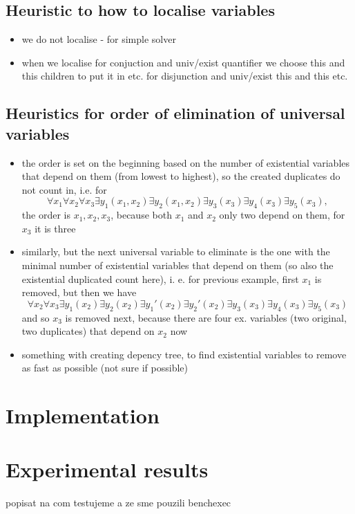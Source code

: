 \documentclass[
  digital, %
  twoside, %
  table,   %
  nolof,     %
  nolot,     %
]{fithesis3}
\theoremstyle{definition}
\theoremstyle{remark}
\begin{document}
\section{Heuristic to how to localise variables}
\begin{itemize}
    \item we do not localise - for simple solver
    \item when we localise for conjuction and univ/exist quantifier we choose this and this children to put it in etc. for disjunction and univ/exist this and this etc.
\end{itemize}

\section{Heuristics for order of elimination of universal variables}
\begin{itemize}
    \item the order is set on the beginning based on the number of existential variables that depend on them (from lowest to highest), so the created duplicates do not count in, i.e. for \[\forall x_1 \forall x_2 \forall x_3 \exists y_1(x_1, x_2) \exists y_2(x_1,x_2) \exists y_3(x_3) \exists y_4(x_3) \exists y_5 (x_3),\] the order is $x_1, x_2, x_3$, because both $x_1$ and $x_2$ only two depend on them, for $x_3$ it is three
    \item similarly, but the next universal variable to eliminate is the one with the minimal number of existential variables that depend on them (so also the existential duplicated count here), i. e. for previous example, first $x_1$ is removed, but then we have \[\forall x_2 \forall x_3 \exists y_1(x_2) \exists y_2(x_2) \exists y_1'(x_2) \exists y_2'(x_2) \exists y_3(x_3) \exists y_4(x_3) \exists y_5 (x_3)\] and so $x_3$ is removed next, because there are four ex. variables (two original, two duplicates) that depend on $x_2$ now
    \item something with creating depency tree, to find existential variables to remove as fast as possible (not sure if possible)
\end{itemize}

\chapter{Implementation}

\chapter{Experimental results}
popisat na com testujeme a ze sme pouzili benchexec
\end{document}
